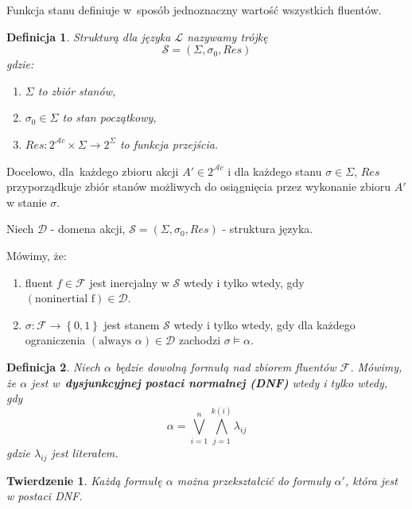 \documentclass[11pt,a4paper]{article}
\newtheorem{defn}{Definicja}
\newtheorem{theorem}{Twierdzenie}
\begin{document}
Funkcja stanu definiuje w~sposób jednoznaczny wartość wszystkich fluentów.

\begin{defn}
    Strukturą dla języka $\mathcal{L}$ nazywamy trójkę
    $$\mathcal{S} = \left(\Sigma, \sigma_0, Res\right)$$
    gdzie:
    \begin{enumerate}
        \item $\Sigma$ to zbiór stanów,
        \item $\sigma_0 \in \Sigma$ to stan początkowy,
        \item $Res : 2^{\mathcal{A}c} \times \Sigma \rightarrow 2^\Sigma$ to funkcja przejścia.
    \end{enumerate}
\end{defn}

Docelowo, dla~każdego zbioru akcji $A' \in 2^{\mathcal{A}c}$ i dla każdego stanu $\sigma \in \Sigma$, $Res$ przyporządkuje zbiór stanów możliwych do osiągnięcia przez wykonanie zbioru $A'$ w stanie $\sigma$.

Niech $\mathcal{D}$ - domena akcji, $\mathcal{S} = \left(\Sigma, \sigma_0, Res\right)$ - struktura języka.

Mówimy, że:
\begin{enumerate}
    \item fluent $f \in \mathcal{F}$  jest inercjalny w $\mathcal{S}$ wtedy i tylko wtedy, gdy $\left(\text{noninertial f}\right) \in \mathcal{D}$.
    \item $\sigma : \mathcal{F} \rightarrow \left\{0,1\right\}$ jest stanem $\mathcal{S}$ wtedy i tylko wtedy, gdy dla każdego ograniczenia $\left(\text{always } \alpha\right) \in \mathcal{D}$ zachodzi $\sigma \models \alpha$.
\end{enumerate}



\begin{defn}
Niech $\alpha$ będzie dowolną formułą nad zbiorem fluentów $\mathcal{F}$. Mówimy, że $\alpha$ jest w~\textbf{dysjunkcyjnej postaci normalnej (DNF)} wtedy i tylko wtedy, gdy 
$$\alpha = \bigvee_{i=1}^{n} \bigwedge_{j=1}^{k(i)} \lambda_{ij}$$
gdzie $\lambda_{ij}$ jest literałem.
\end{defn}

\begin{theorem}
Każdą formułę $\alpha$ można przekształcić do formuły $\alpha'$, która jest w postaci DNF.
\end{theorem}
\end{document}
